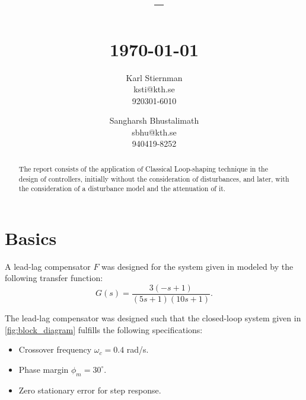 \documentclass[a4paper]{article}
\title{
	\vspace{1.5in}
	\textmd{\textbf{\hmwkClass\ -- \hmwkClassName}}\\
	\vspace{0.2in}
	\textmd{\textbf{\hmwkTitle}}\\
	\normalsize\vspace{0.1in}\small{\today}\\
	\vspace{2in}
}
\author{
	Karl Stiernman\\
	ksti@kth.se\\
    920301-6010
	\and
	Sangharsh Bhustalimath\\
	sbhu@kth.se\\
	940419-8252
}
\date{}
\begin{document}
\maketitle

\vfill
\begin{abstract}
	The report consists of the application of Classical Loop-shaping technique in the design of controllers, initially without the consideration of disturbances, and later, with the consideration of a disturbance model and the attenuation of it.
\end{abstract}
\newpage





\section{Basics}
A lead-lag compensator $F$ was designed for the system given in \cite{exercise} modeled by the following transfer function:
\begin{equation}
	G(s) = \frac{3(-s+1)}{(5s+1)(10s+1)}.
	\label{eq:system}
\end{equation}

The lead-lag compensator was designed such that the closed-loop system  given in \cref{fig:block_diagram} fulfills the following specifications:
\begin{itemize}\setlength{\itemsep}{-2pt}
	\item Crossover frequency $\omega_c = 0.4$ rad/s.
	\item Phase margin $\phi_m = 30^\circ$.
	\item Zero stationary error for step response. 
\end{itemize}
\end{document}
